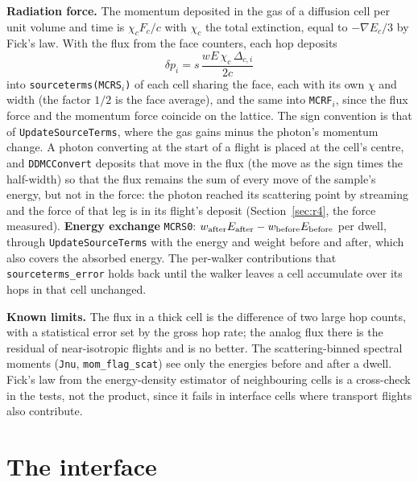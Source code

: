 \documentclass[11pt]{article}
\begin{document}
\textbf{Radiation force.}  The momentum deposited in the gas of a diffusion cell per
unit volume and time is $\chi_c F_c/c$ with $\chi_c$ the total extinction, equal to
$-\nabla E_c/3$ by Fick's law.  With
the flux from the face counters, each hop deposits
\begin{equation}
  \delta p_i = s\,\frac{wE\,\chi_c\,\Delta_{c,i}}{2c}
\end{equation}
into \texttt{sourceterms(MCRS}$_i$\texttt{)} of each cell sharing the face, each with
its own $\chi$ and width (the factor $1/2$ is the face average), and the same into
\texttt{MCRF}$_i$, since the flux force and the momentum force coincide on the
lattice.  The sign convention is that of \texttt{UpdateSourceTerms}, where the gas
gains minus the photon's momentum change.  A photon converting at the start of a flight
is placed at the cell's centre, and \texttt{DDMCConvert} deposits that move in the flux
(the move as the sign times the half-width) so that the flux remains the sum of every
move of the sample's energy, but not in the force: the photon reached its scattering
point by streaming and the force of that leg is in its flight's deposit
(Section~\ref{sec:r4}, the force measured).  \textbf{Energy exchange}
\texttt{MCRS0}: $w_{\rm after}E_{\rm after} - w_{\rm before}E_{\rm before}$ per dwell,
through \texttt{UpdateSourceTerms} with the energy and weight before and after, which
also covers the absorbed energy.  The per-walker contributions that
\texttt{sourceterms\_error} holds back until the walker leaves a cell accumulate over
its hops in that cell unchanged.

\textbf{Known limits.}  The flux in a thick cell is the difference of two large hop
counts, with a statistical error set by the gross hop rate; the analog flux there is the
residual of near-isotropic flights and is no better.  The scattering-binned spectral
moments (\texttt{Jnu}, \texttt{mom\_flag\_scat}) see only the energies before and
after a dwell.  Fick's law from the energy-density estimator of neighbouring cells is a
cross-check in the tests, not the product, since it fails in interface cells where
transport flights also contribute.

\section{The interface}
\label{sec:interface}
\end{document}
